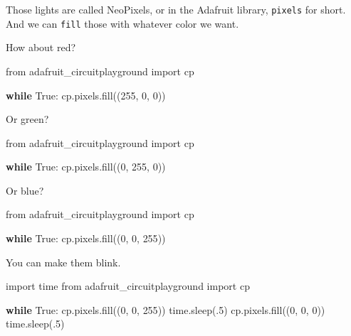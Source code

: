 \documentclass[
]{book}
\newenvironment{Shaded}{\begin{snugshade}}{\end{snugshade}}
\newcommand{\ControlFlowTok}[1]{\textcolor[rgb]{0.13,0.29,0.53}{\textbf{#1}}}
\newcommand{\DecValTok}[1]{\textcolor[rgb]{0.00,0.00,0.81}{#1}}
\newcommand{\ImportTok}[1]{#1}
\newcommand{\NormalTok}[1]{#1}
\newcommand{\VariableTok}[1]{\textcolor[rgb]{0.00,0.00,0.00}{#1}}
\begin{document}
Those lights are called NeoPixels, or in the Adafruit library, \texttt{pixels} for short. And we can \texttt{fill} those with whatever color we want.

How about red?

\begin{Shaded}
\begin{Highlighting}[]
\ImportTok{from}\NormalTok{ adafruit_circuitplayground }\ImportTok{import}\NormalTok{ cp}
 
\ControlFlowTok{while} \VariableTok{True}\NormalTok{:}
\NormalTok{    cp.pixels.fill((}\DecValTok{255}\NormalTok{, }\DecValTok{0}\NormalTok{, }\DecValTok{0}\NormalTok{)) }
\end{Highlighting}
\end{Shaded}

Or green?

\begin{Shaded}
\begin{Highlighting}[]
\ImportTok{from}\NormalTok{ adafruit_circuitplayground }\ImportTok{import}\NormalTok{ cp}
 
\ControlFlowTok{while} \VariableTok{True}\NormalTok{:}
\NormalTok{    cp.pixels.fill((}\DecValTok{0}\NormalTok{, }\DecValTok{255}\NormalTok{, }\DecValTok{0}\NormalTok{)) }
\end{Highlighting}
\end{Shaded}

Or blue?

\begin{Shaded}
\begin{Highlighting}[]
\ImportTok{from}\NormalTok{ adafruit_circuitplayground }\ImportTok{import}\NormalTok{ cp}
 
\ControlFlowTok{while} \VariableTok{True}\NormalTok{:}
\NormalTok{    cp.pixels.fill((}\DecValTok{0}\NormalTok{, }\DecValTok{0}\NormalTok{, }\DecValTok{255}\NormalTok{)) }
\end{Highlighting}
\end{Shaded}

You can make them blink.

\begin{Shaded}
\begin{Highlighting}[]
\ImportTok{import}\NormalTok{ time}
\ImportTok{from}\NormalTok{ adafruit_circuitplayground }\ImportTok{import}\NormalTok{ cp}
 
\ControlFlowTok{while} \VariableTok{True}\NormalTok{:}
\NormalTok{    cp.pixels.fill((}\DecValTok{0}\NormalTok{, }\DecValTok{0}\NormalTok{, }\DecValTok{255}\NormalTok{)) }
\NormalTok{    time.sleep(.}\DecValTok{5}\NormalTok{)}
\NormalTok{    cp.pixels.fill((}\DecValTok{0}\NormalTok{, }\DecValTok{0}\NormalTok{, }\DecValTok{0}\NormalTok{))}
\NormalTok{    time.sleep(.}\DecValTok{5}\NormalTok{)}
\end{Highlighting}
\end{Shaded}
\end{document}
